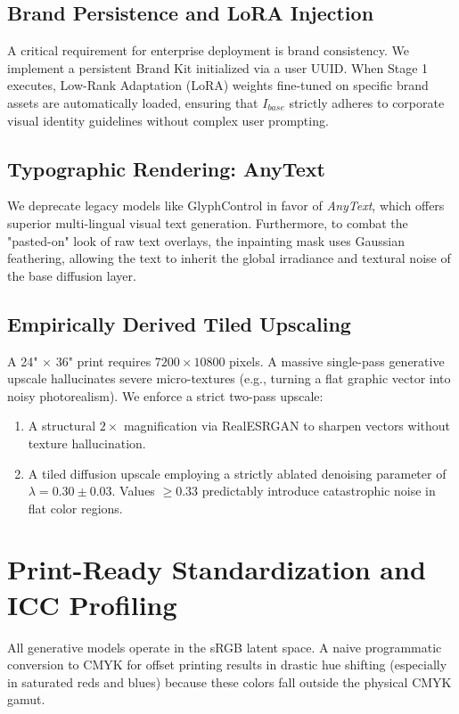 \documentclass[10pt,journal,compsoc]{IEEEtran}
\begin{document}
\subsection{Brand Persistence and LoRA Injection}
A critical requirement for enterprise deployment is brand consistency. We implement a persistent Brand Kit initialized via a user UUID. When Stage 1 executes, Low-Rank Adaptation (LoRA) weights fine-tuned on specific brand assets are automatically loaded, ensuring that $I_{base}$ strictly adheres to corporate visual identity guidelines without complex user prompting.

\subsection{Typographic Rendering: AnyText}
We deprecate legacy models like GlyphControl in favor of \textit{AnyText}, which offers superior multi-lingual visual text generation. Furthermore, to combat the "pasted-on" look of raw text overlays, the inpainting mask uses Gaussian feathering, allowing the text to inherit the global irradiance and textural noise of the base diffusion layer.

\subsection{Empirically Derived Tiled Upscaling}
A 24" $\times$ 36" print requires $7200 \times 10800$ pixels. A massive single-pass generative upscale hallucinates severe micro-textures (e.g., turning a flat graphic vector into noisy photorealism). 
We enforce a strict two-pass upscale:
\begin{enumerate}
    \item A structural $2\times$ magnification via RealESRGAN to sharpen vectors without texture hallucination.
    \item A tiled diffusion upscale employing a strictly ablated denoising parameter of $\lambda = 0.30 \pm 0.03$. Values $\ge 0.33$ predictably introduce catastrophic noise in flat color regions.
\end{enumerate}

\section{Print-Ready Standardization and ICC Profiling}
All generative models operate in the sRGB latent space. A naive programmatic conversion to CMYK for offset printing results in drastic hue shifting (especially in saturated reds and blues) because these colors fall outside the physical CMYK gamut.
\end{document}
